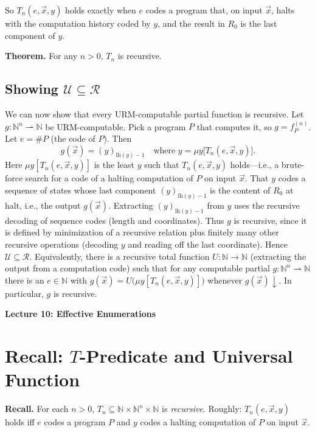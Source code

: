 \documentclass[11pt]{article}
\begin{document}
So $T_n(e, \vec{x}, y)$ holds exactly when $e$ codes a program that, on input $\vec{x}$, halts with the computation history coded by $y$, and the result in $R_0$ is the last component of $y$.

\textbf{Theorem.} For any $n > 0$, $T_n$ is recursive.

\subsection{Showing $\mathcal{U} \subseteq \mathcal{R}$}

We can now show that every URM-computable partial function is recursive. Let $g\colon \mathbb{N}^n \rightharpoonup \mathbb{N}$ be URM-computable. Pick a program $P$ that computes it, so $g = f_P^{(n)}$. Let $e = \#P$ (the code of $P$). Then
\[
    g(\vec{x}) = (y)_{\mathrm{lh}(y)-1} \quad \text{where } y = \mu y\bigl[T_n(e, \vec{x}, y)\bigr].
\]
Here $\mu y[T_n(e, \vec{x}, y)]$ is the least $y$ such that $T_n(e, \vec{x}, y)$ holds---i.e., a brute-force search for a code of a halting computation of $P$ on input $\vec{x}$. That $y$ codes a sequence of states whose last component $(y)_{\mathrm{lh}(y)-1}$ is the content of $R_0$ at halt, i.e., the output $g(\vec{x})$. Extracting $(y)_{\mathrm{lh}(y)-1}$ from $y$ uses the recursive decoding of sequence codes (length and coordinates). Thus $g$ is recursive, since it is defined by minimization of a recursive relation plus finitely many other recursive operations (decoding $y$ and reading off the last coordinate). Hence $\mathcal{U} \subseteq \mathcal{R}$. Equivalently, there is a recursive total function $U\colon \mathbb{N} \to \mathbb{N}$ (extracting the output from a computation code) such that for any computable partial $g\colon \mathbb{N}^n \rightharpoonup \mathbb{N}$ there is an $e \in \mathbb{N}$ with $g(\vec{x}) = U\bigl(\mu y[T_n(e, \vec{x}, y)]\bigr)$ whenever $g(\vec{x}){\downarrow}$. In particular, $g$ is recursive.

\newpage

{\LARGE\bfseries Lecture 10: Effective Enumerations}

\section{Recall: $T$-Predicate and Universal Function}

\textbf{Recall.} For each $n > 0$, $T_n \subseteq \mathbb{N} \times \mathbb{N}^n \times \mathbb{N}$ is \emph{recursive}. Roughly: $T_n(e, \vec{x}, y)$ holds iff $e$ codes a program $P$ and $y$ codes a halting computation of $P$ on input $\vec{x}$.
\end{document}

